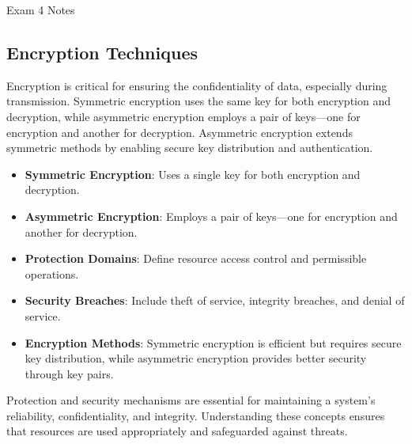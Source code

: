 \begin{examnotes}{Exam 4 Notes}
    \subsection*{Encryption Techniques}
    
    Encryption is critical for ensuring the confidentiality of data, especially during transmission. Symmetric encryption uses the same key for both encryption and decryption, while asymmetric encryption 
    employs a pair of keys—one for encryption and another for decryption. Asymmetric encryption extends symmetric methods by enabling secure key distribution and authentication.
    
    \begin{highlight}
        \begin{itemize}
            \item \textbf{Symmetric Encryption}: Uses a single key for both encryption and decryption.
            \item \textbf{Asymmetric Encryption}: Employs a pair of keys—one for encryption and another for decryption.
        \end{itemize}
    \end{highlight}
    
    \begin{highlight}
        \begin{itemize}
            \item \textbf{Protection Domains}: Define resource access control and permissible operations.
            \item \textbf{Security Breaches}: Include theft of service, integrity breaches, and denial of service.
            \item \textbf{Encryption Methods}: Symmetric encryption is efficient but requires secure key distribution, while asymmetric encryption provides better security through key pairs.
        \end{itemize}
    \end{highlight}
    
    Protection and security mechanisms are essential for maintaining a system's reliability, confidentiality, and integrity. Understanding these concepts ensures that resources are used appropriately 
    and safeguarded against threats.
\end{examnotes}